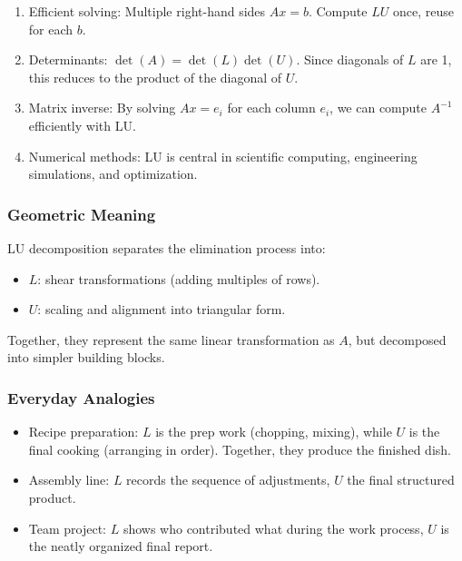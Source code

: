 \documentclass[
  letterpaper,
  DIV=11,
  numbers=noendperiod]{scrreprt}
\providecommand{\tightlist}{%
  \setlength{\itemsep}{0pt}\setlength{\parskip}{0pt}}
\begin{document}
\begin{enumerate}
\def\labelenumi{\arabic{enumi}.}
\tightlist
\item
  Efficient solving: Multiple right-hand sides \(Ax = b\). Compute
  \(LU\) once, reuse for each \(b\).
\item
  Determinants: \(\det(A) = \det(L)\det(U)\). Since diagonals of \(L\)
  are 1, this reduces to the product of the diagonal of \(U\).
\item
  Matrix inverse: By solving \(Ax = e_i\) for each column \(e_i\), we
  can compute \(A^{-1}\) efficiently with LU.
\item
  Numerical methods: LU is central in scientific computing, engineering
  simulations, and optimization.
\end{enumerate}

\subsubsection{Geometric Meaning}\label{geometric-meaning-3}

LU decomposition separates the elimination process into:

\begin{itemize}
\tightlist
\item
  \(L\): shear transformations (adding multiples of rows).
\item
  \(U\): scaling and alignment into triangular form.
\end{itemize}

Together, they represent the same linear transformation as \(A\), but
decomposed into simpler building blocks.

\subsubsection{Everyday Analogies}\label{everyday-analogies-26}

\begin{itemize}
\tightlist
\item
  Recipe preparation: \(L\) is the prep work (chopping, mixing), while
  \(U\) is the final cooking (arranging in order). Together, they
  produce the finished dish.
\item
  Assembly line: \(L\) records the sequence of adjustments, \(U\) the
  final structured product.
\item
  Team project: \(L\) shows who contributed what during the work
  process, \(U\) is the neatly organized final report.
\end{itemize}
\end{document}
